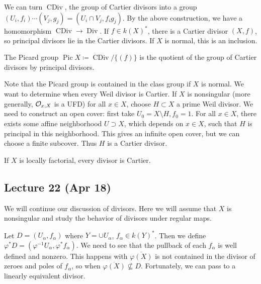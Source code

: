 \documentclass[twoside, 10pt]{article}
\begin{document}
        We can turn $\operatorname{CDiv}$, the group of Cartier divisors into a
        group $(U_i,f_i) \cdots (V_j,g_j) = (U_i \cap V_j, f_ig_j)$. By the
        above construction, we have a homomorphism $\operatorname{CDiv} \to
        \operatorname{Div}$. If $f \in k(X)^*$, there is a Cartier divisor
        $(X,f)$, so principal divisors lie in the Cartier divisors. If $X$ is
        normal, this is an inclusion.

        \begin{defn} The Picard group $\operatorname{Pic} X
        \coloneqq \operatorname{CDiv}/\{(f)\}$ is the quotient of the group of
    Cartier divisors by principal divisors.  \end{defn}

        Note that the Picard group is contained in the class group if $X$ is
        normal. We want to determine when every Weil divisor is Cartier. If $X$
        is nonsingular (more generally, $\mathcal{O}_{x,X}$ is a UFD) for all $x \in
        X$, choose $H \subset X$ a prime Weil divisor. We need to construct an
        open cover: first take $U_0 = X \setminus H, f_0 = 1$. For all $x \in
        X$, there exists some affine neighborhood $U \supset X$, which depends
        on $x \in X$, such that $H$ is principal in this neighborhood. This
        gives an infinite open cover, but we can choose a finite subcover. Thus
        $H$ is a Cartier divisor.

        \begin{cor} If $X$ is locally factorial, every divisor is Cartier.
        \end{cor}

        \subsection{Lecture 22 (Apr 18)} We will continue our discussion of
        divisors. Here we will assume that $X$ is nonsingular and study the
        behavior of divisors under regular maps.

        Let $D = (U_{\alpha}, f_{\alpha})$ where $Y= \cup U_{\alpha}$,
        $f_{\alpha}\in k(Y)^*$. Then we define $\varphi^*D =
        (\varphi^{-1}U_{\alpha}, \varphi^* f_{\alpha})$. We need to see that
        the pullback of each $f_{\alpha}$ is well defined and nonzero. This
        happens with $\overline{\varphi(X)}$ is not contained in the divisor of
        zeroes and poles of $f_{\alpha}$, so when $\overline{\varphi(X)}
        \not\subseteq D$. Fortunately, we can pass to a linearly equivalent
        divisor.
\end{document}
